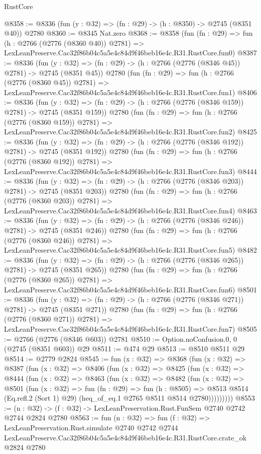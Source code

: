 \begin{lexlean}{RustCore}
\begin{coremodule}
@8358 := @8336 (fun (y : @32) => (fn : @29) -> (h : @8350) -> @2745 (@8351 @40)) @2780
@8360 := @8345 Nat.zero
@8368 := @8358
    (fun (fn : @29) =>
    fun (h : @2766 (@2776 (@8360 @40)) @2781) =>
    LexLeanPreserve.Cac32f86b04c5a5e4c84d9f46beb16e4c.R31.RustCore.fun0)
@8387 := @8336
    (fun (y : @32) => (fn : @29) -> (h : @2766 (@2776 (@8346 @45)) @2781) -> @2745 (@8351 @45))
    @2780
    (fun (fn : @29) =>
    fun (h : @2766 (@2776 (@8360 @45)) @2781) =>
    LexLeanPreserve.Cac32f86b04c5a5e4c84d9f46beb16e4c.R31.RustCore.fun1)
@8406 := @8336
    (fun (y : @32) => (fn : @29) -> (h : @2766 (@2776 (@8346 @159)) @2781) -> @2745 (@8351 @159))
    @2780
    (fun (fn : @29) =>
    fun (h : @2766 (@2776 (@8360 @159)) @2781) =>
    LexLeanPreserve.Cac32f86b04c5a5e4c84d9f46beb16e4c.R31.RustCore.fun2)
@8425 := @8336
    (fun (y : @32) => (fn : @29) -> (h : @2766 (@2776 (@8346 @192)) @2781) -> @2745 (@8351 @192))
    @2780
    (fun (fn : @29) =>
    fun (h : @2766 (@2776 (@8360 @192)) @2781) =>
    LexLeanPreserve.Cac32f86b04c5a5e4c84d9f46beb16e4c.R31.RustCore.fun3)
@8444 := @8336
    (fun (y : @32) => (fn : @29) -> (h : @2766 (@2776 (@8346 @203)) @2781) -> @2745 (@8351 @203))
    @2780
    (fun (fn : @29) =>
    fun (h : @2766 (@2776 (@8360 @203)) @2781) =>
    LexLeanPreserve.Cac32f86b04c5a5e4c84d9f46beb16e4c.R31.RustCore.fun4)
@8463 := @8336
    (fun (y : @32) => (fn : @29) -> (h : @2766 (@2776 (@8346 @246)) @2781) -> @2745 (@8351 @246))
    @2780
    (fun (fn : @29) =>
    fun (h : @2766 (@2776 (@8360 @246)) @2781) =>
    LexLeanPreserve.Cac32f86b04c5a5e4c84d9f46beb16e4c.R31.RustCore.fun5)
@8482 := @8336
    (fun (y : @32) => (fn : @29) -> (h : @2766 (@2776 (@8346 @265)) @2781) -> @2745 (@8351 @265))
    @2780
    (fun (fn : @29) =>
    fun (h : @2766 (@2776 (@8360 @265)) @2781) =>
    LexLeanPreserve.Cac32f86b04c5a5e4c84d9f46beb16e4c.R31.RustCore.fun6)
@8501 := @8336
    (fun (y : @32) => (fn : @29) -> (h : @2766 (@2776 (@8346 @271)) @2781) -> @2745 (@8351 @271))
    @2780
    (fun (fn : @29) =>
    fun (h : @2766 (@2776 (@8360 @271)) @2781) =>
    LexLeanPreserve.Cac32f86b04c5a5e4c84d9f46beb16e4c.R31.RustCore.fun7)
@8505 := @2766 (@2776 (@8346 @603)) @2781
@8510 := Option.noConfusion.{0, 0} (@2745 (@8351 @603)) @29
@8511 := @474 @29
@8513 := @8510 @8511 @29
@8514 := @2779 @2824
@8545 := fun (x : @32) =>
  @8368
    (fun (x : @32) =>
    @8387
      (fun (x : @32) =>
      @8406
        (fun (x : @32) =>
        @8425
          (fun (x : @32) =>
          @8444
            (fun (x : @32) =>
            @8463
              (fun (x : @32) =>
              @8482
                (fun (x : @32) =>
                @8501
                  (fun (x : @32) =>
                  fun (fn : @29) =>
                  fun (h : @8505) =>
                  @8513
                    @8514
                    (Eq.refl.{2} (Sort 1) @29)
                    (heq_of_eq.{1} @2765 @8511 @8514 @2780)))))))))
@8553 := (n : @32) -> (f : @32) -> LexLeanPreservation.Rust.FunSem @2740 @2742 @2744 @2824 @2780
@8563 := fun (n : @32) =>
  fun (f : @32) =>
  LexLeanPreservation.Rust.simulate
    @2740
    @2742
    @2744
    LexLeanPreserve.Cac32f86b04c5a5e4c84d9f46beb16e4c.R31.RustCore.crate_ok
    @2824
    @2780
\end{coremodule}
\end{lexlean}
